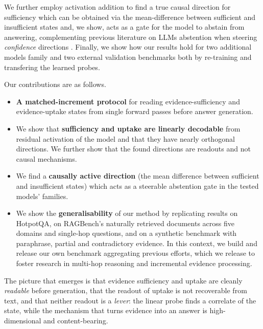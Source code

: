 We further employ activation addition \cite{ActivationSteering} to find a true causal direction for sufficiency which can be obtained via the mean-difference between sufficient and insufficient states and, we show, acts as a gate for the model to abstain  from answering, complementing previous literature on LLMs abstention when steering \emph{confidence} directions \cite{Kumaran2026}. Finally, we show how our results hold for two additional models family and two external validation benchmarks both by re-training and transfering the learned probes. 

Our contributions are as follows.
\begin{itemize}
  \item \textbf{A matched-increment protocol} for reading evidence-sufficiency and evidence-uptake states from single forward passes before answer generation.
  \item We show that \textbf{sufficiency and uptake are linearly decodable} from residual activation of the model and that they have nearly orthogonal directions. We further show that the found directions are readouts and not causal mechanisms.
  \item We find a \textbf{causally active direction} (the mean difference between sufficient and insufficient states) which acts as a steerable abstention gate in the tested models' families.
  \item We show the \textbf{generalisability} of our method by replicating results on HotpotQA, on RAGBench's naturally retrieved documents across five domains and single-hop questions, and on a synthetic benchmark with paraphrase, partial and contradictory evidence. In this context, we build and release our own benchmark aggregating previous efforts, which we release to foster research in multi-hop reasoning and incremental evidence processing.
\end{itemize}
The picture that emerges is that evidence sufficiency and uptake are cleanly \emph{readable} before generation, that the readout of uptake is not recoverable from text, and that neither readout is a \emph{lever}: the linear probe finds a correlate of the state, while the mechanism that turns evidence into an answer is high-dimensional and content-bearing.
